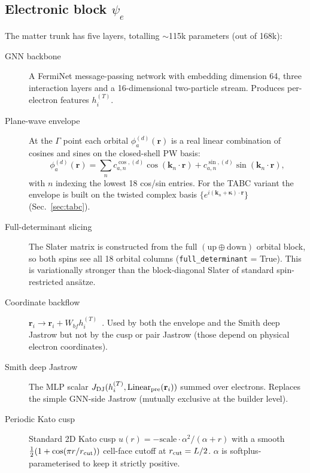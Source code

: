 \documentclass[reprint,amsmath,amssymb,aps,prb,floatfix,nofootinbib]{revtex4-2}
\begin{document}
\subsection{Electronic block $\psi_e$}
The matter trunk has five layers, totalling $\sim$115k parameters
(out of 168k):

\begin{description}
\item[GNN backbone] A FermiNet message-passing network
      \cite{Pfau2020} with embedding dimension 64, three interaction
      layers and a 16-dimensional two-particle stream.  Produces
      per-electron features $h_i^{(T)}$.
\item[Plane-wave envelope] At the $\Gamma$ point each orbital
      $\phi_a^{(d)}(\mathbf{r})$ is a real linear combination of
      cosines and sines on the closed-shell PW basis:
      \begin{equation}
      \phi_a^{(d)}(\mathbf{r}) = \sum_n c^{\cos,(d)}_{a,n}\cos(\mathbf k_n\cdot \mathbf r)
                              + c^{\sin,(d)}_{a,n}\sin(\mathbf k_n\cdot \mathbf r),
      \end{equation}
      with $n$ indexing the lowest 18 cos/sin entries.  For the TABC
      variant the envelope is built on the twisted complex basis
      $\{e^{i (\mathbf k_n + \bm\kappa)\cdot \mathbf r}\}$
      (Sec.~\ref{sec:tabc}).
\item[Full-determinant slicing] The Slater matrix is constructed
      from the full $(\text{up} \oplus \text{down})$ orbital block, so
      both spins see all 18 orbital columns
      (\texttt{full\_determinant} = True).  This is variationally
      stronger than the block-diagonal Slater of standard
      spin-restricted ans\"atze.
\item[Coordinate backflow] $\mathbf{r}_i \to \mathbf{r}_i + W_{bf}
      h_i^{(T)}$~\cite{Smith2024}.  Used by both the envelope and
      the Smith deep Jastrow but not by the cusp or pair Jastrow
      (those depend on physical electron coordinates).
\item[Smith deep Jastrow] \cite{Smith2024} The MLP scalar
      $J_{\rm DJ}(h_i^{(T)}, \mathrm{Linear}_{\rm pre}(\mathbf{r}_i))$
      summed over electrons.  Replaces the simple GNN-side Jastrow
      (mutually exclusive at the builder level).
\item[Periodic Kato cusp] Standard 2D Kato cusp
      $u(r) = -\mathrm{scale} \cdot \alpha^2/(\alpha + r)$ with
      a smooth $\tfrac12(1 + \cos(\pi r/r_{\rm cut}))$
      cell-face cutoff at $r_{\rm cut} = L/2$.
      $\alpha$ is softplus-parameterised to keep it strictly
      positive.
\end{description}
\end{document}

